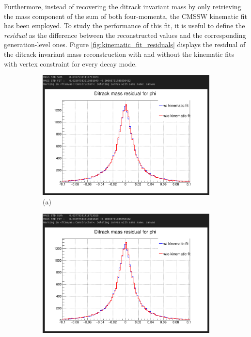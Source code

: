 \begin{myitemlist}
    Furthermore, instead of recovering the ditrack invariant mass by only retrieving the mass component of the sum of both four-momenta, the CMSSW kinematic fit has been employed. To study the performance of this fit, it is useful to define the \textit{residual} as the difference between the reconstructed values and the corresponding generation-level ones. Figure \ref{fig:kinematic_fit_residuals} displays the residual of the ditrack invariant mass reconstruction with and without the kinematic fits with vertex constraint for every decay mode.
    \begin{figure}[!ht]
        \captionsetup[subfigure]{labelformat=empty}
        \vspace*{-0.2cm}
        \centering
        \setlength{\mylength}{\textwidth}
        \begin{subfigure}[t]{0.50\mylength}
                \centering
                \includegraphics[width=0.45\mylength]{resources/plots/kinematic_fit_residual_phi.png}
                \caption{\footnotesize (a)}
        \end{subfigure}%
        \begin{subfigure}[t]{0.50\mylength}
                \centering
                \includegraphics[width=0.45\mylength]{resources/plots/kinematic_fit_residual_omega.png}

\end{subfigure}
\end{figure}
\end{myitemlist}
